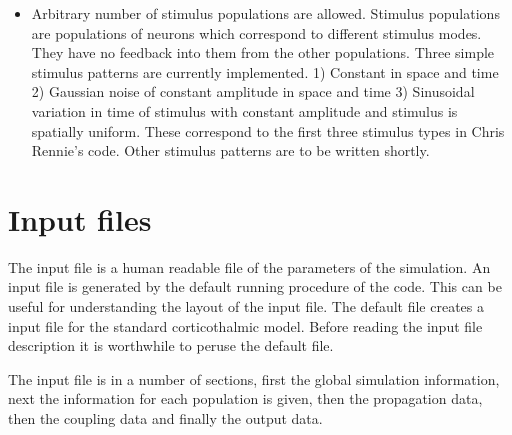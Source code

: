 \documentclass[12pt,a4paper]{article}
\begin{document}
\begin{itemize}
\item Arbitrary number of stimulus populations are allowed. Stimulus populations
  are populations of neurons which correspond to different stimulus 
  modes. They have no feedback into them from the other populations.
  Three simple stimulus patterns are currently implemented.
  1) Constant in space and time 2) Gaussian noise of constant amplitude
  in space and time 3) Sinusoidal variation in time of stimulus with constant
  amplitude and stimulus is spatially uniform.
  These correspond to the first three stimulus types in Chris Rennie's code.
  Other stimulus patterns are to be written shortly.
  
\end{itemize}
 
\section{Input files}

The input file is a human readable file of the parameters of the simulation.
An input file is generated by the default running procedure of the code. This can be
useful for understanding the layout of the input file. The default file
creates a input file for the standard corticothalmic model. Before
reading the input file description it is worthwhile to 
peruse the default file.

The input file is in a number of sections, first the global simulation information,
next the information for each population is given, then the propagation data,
then the coupling data and finally the output data.
\end{document}
